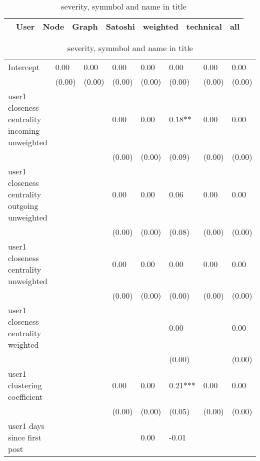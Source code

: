 \begin{table}
\caption{severity, symmbol and name in title}
\begin{center}
\begin{tabular}{lccccccc}
\hline
                                               &   User  &   Node  &  Graph  & Satoshi & weighted & technical &   all    \\
\hline
\hline
\end{tabular}
\begin{tabular}{llllllll}
Intercept                                      & 0.00    & 0.00    & 0.00    & 0.00    & 0.00     & 0.00      & 0.00     \\
                                               & (0.00)  & (0.00)  & (0.00)  & (0.00)  & (0.00)   & (0.00)    & (0.00)   \\
user1 closeness centrality incoming unweighted &         &         & 0.00    & 0.00    & 0.18**   & 0.00      & 0.00     \\
                                               &         &         & (0.00)  & (0.00)  & (0.09)   & (0.00)    & (0.00)   \\
user1 closeness centrality outgoing unweighted &         &         & 0.00    & 0.00    & 0.06     & 0.00      & 0.00     \\
                                               &         &         & (0.00)  & (0.00)  & (0.08)   & (0.00)    & (0.00)   \\
user1 closeness centrality unweighted          &         &         & 0.00    & 0.00    & 0.00     & 0.00      & 0.00     \\
                                               &         &         & (0.00)  & (0.00)  & (0.00)   & (0.00)    & (0.00)   \\
user1 closeness centrality weighted            &         &         &         &         & 0.00     &           & 0.00     \\
                                               &         &         &         &         & (0.00)   &           & (0.00)   \\
user1 clustering coefficient                   &         &         & 0.00    & 0.00    & 0.21***  & 0.00      & 0.00     \\
                                               &         &         & (0.00)  & (0.00)  & (0.05)   & (0.00)    & (0.00)   \\
user1 days since first post                    &         &         &         & 0.00    & -0.01    &           &          \\

\end{tabular}
\end{center}
\end{table}
